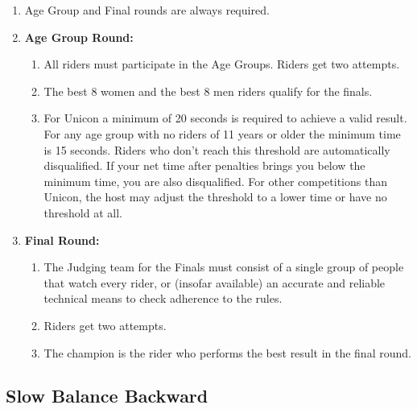 \begin{enumerate}[leftmargin=1.5em,labelsep=*]
	\item Age Group and Final rounds are always required.
	
	\item \textbf{Age Group Round:}
	\begin{enumerate}[label*=\arabic*,leftmargin=1.5em,labelsep=*]
		\item All riders must participate in the Age Groups.
		Riders get two attempts.
		\item The best 8 women and the best 8 men riders qualify for the finals.
		\item For Unicon a minimum of 20 seconds is required to achieve a valid result.
		For any age group with no riders of 11 years or older the minimum time is 15 seconds.
		Riders who don't reach this threshold are automatically disqualified.
		If your net time after penalties brings you below the minimum time, you are also disqualified.
		For other competitions than Unicon, the host may adjust the threshold to a lower time or have no threshold at all.
	\end{enumerate}
	
	\item \textbf{Final Round:}
	\begin{enumerate}[label*=\arabic*,leftmargin=1.5em,labelsep=*]
		\item The Judging team for the Finals must consist of a single group of people that watch every rider, 
    or (insofar available) an accurate and reliable technical means to check adherence to the rules.
		\item Riders get two attempts.
		\item The champion is the rider who performs the best result in the final round.
	\end{enumerate}
\end{enumerate}

\subsection{Slow Balance Backward}

